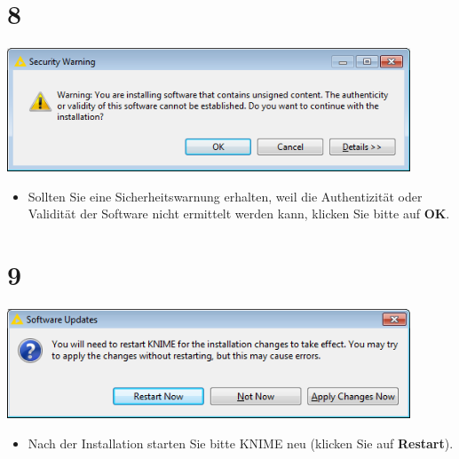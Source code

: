 \documentclass{beamer}
\begin{document}
\section{8}
\begin{frame}
	\begin{center}
  		\includegraphics[width=0.9\textwidth]{8.png}
	\end{center}
	\begin{itemize}
		\item Sollten Sie eine Sicherheitswarnung erhalten, weil die Authentizität oder Validität der Software nicht ermittelt werden kann, klicken Sie bitte auf \textbf{OK}.
	\end{itemize}
\end{frame}

\section{9}
\begin{frame}
	\begin{center}
  		\includegraphics[width=0.9\textwidth]{9.png}
	\end{center}
	\begin{itemize}
		\item Nach der Installation starten Sie bitte KNIME neu (klicken Sie auf \textbf{Restart}).
	\end{itemize}
\end{frame}
\end{document}
